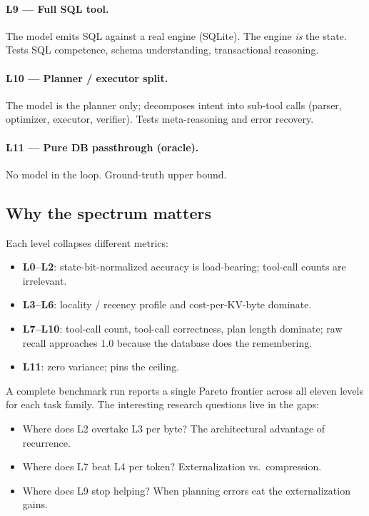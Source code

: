 \documentclass[11pt]{article}
\begin{document}
\paragraph{L9 --- Full SQL tool.}
The model emits SQL against a real engine (SQLite). The engine
\emph{is} the state. Tests SQL competence, schema understanding,
transactional reasoning.

\paragraph{L10 --- Planner / executor split.}
The model is the planner only; decomposes intent into sub-tool calls
(parser, optimizer, executor, verifier). Tests meta-reasoning and error
recovery.

\paragraph{L11 --- Pure DB passthrough (oracle).}
No model in the loop. Ground-truth upper bound.

\subsection{Why the spectrum matters}

Each level collapses different metrics:

\begin{itemize}[leftmargin=*]
  \item \textbf{L0--L2}: state-bit-normalized accuracy is load-bearing;
    tool-call counts are irrelevant.
  \item \textbf{L3--L6}: locality / recency profile and cost-per-KV-byte
    dominate.
  \item \textbf{L7--L10}: tool-call count, tool-call correctness, plan
    length dominate; raw recall approaches $1.0$ because the database
    does the remembering.
  \item \textbf{L11}: zero variance; pins the ceiling.
\end{itemize}

A complete benchmark run reports a single Pareto frontier across all
eleven levels for each task family. The interesting research questions
live in the gaps:

\begin{itemize}[leftmargin=*]
  \item Where does L2 overtake L3 per byte? The architectural advantage
    of recurrence.
  \item Where does L7 beat L4 per token? Externalization vs.\
    compression.
  \item Where does L9 stop helping? When planning errors eat the
    externalization gains.
\end{itemize}
\end{document}
